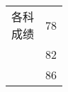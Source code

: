 \begin{tabular}{|c|r|}
\hline
\multirowcell{3}{各科\\成绩} & 78 \\
\cline{2-2} & 82 \\ \cline{2-2}
 & 86 \\ \hline
\end{tabular}
